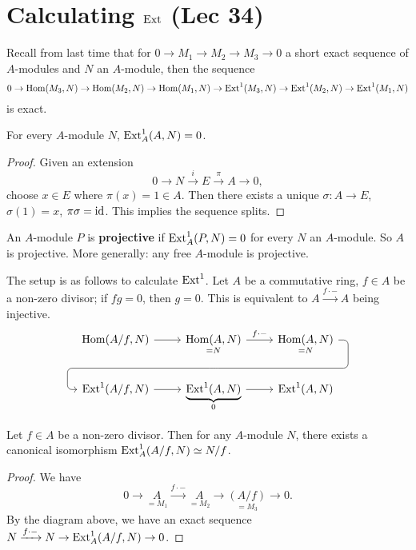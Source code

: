 \section{Calculating $\operatorname{Ext}$ (Lec 34)} 
Recall from last time that for $0 \to M_1 \to M_2 \to M_3 \to 0$ a short exact sequence of $A$-modules and $N$ an $A$-module, then the sequence \[
    0 \to \operatorname{Hom}(M_3,N) \to \operatorname{Hom}(M_2,N) \to \operatorname{Hom}(M_1,N) \to \operatorname{Ext}^1(M_3,N) \to \operatorname{Ext}^1(M_2,N) \to \operatorname{Ext}^1(M_1,N)
\] is exact.
\begin{lemma}
    For every $A$-module $N$, $\operatorname{Ext}^1_A(A,N)=0$.
\end{lemma}
\begin{proof}
    Given an extension \[
    0 \to  N \xrightarrow iE \xrightarrow{\pi} A \to 0,
\] choose $x \in E$ where $\pi(x)=1 \in  A$. Then there exists a unique $\sigma \colon A \to E$, $\sigma(1)=x$, $\pi \sigma=\operatorname{id}$. This implies the sequence splits.
\end{proof}
\begin{remark}
    An $A$-module $P$ is \textbf{projective} if $\operatorname{Ext}_A^1(P,N)=0$ for every $N$ an $A$-module. So $A$ is projective. More generally: any free $A$-module is projective. 
\end{remark}

The setup is as follows to calculate $\operatorname{Ext}^1$. Let $A$ be a commutative ring, $f \in A$ be a non-zero divisor; if $fg=0$, then $g=0$. This is equivalent to $A \xrightarrow{f \cdot -} A$ being injective.
\[
\begin{tikzcd}
    \Hom(A /f,N) \rar & \underset{=N}{\Hom(A,N)}  \arrow[r,"f\cdot -"]
             \ar[draw=none]{d}[name=X, anchor=center]{}
                     & \underset{=N}{\Hom(A,N)}  \ar[rounded corners,
            to path={ -- ([xshift=2ex]\tikztostart.east)
                      |- (X.center) \tikztonodes
                      -| ([xshift=-2ex]\tikztotarget.west)
                      -- (\tikztotarget)}]{dll}[at end]{} \\      
\Ext^1(A /f,N) \rar & \underset{0}{\underbrace{\Ext^1(A,N)}}  \rar & \Ext^1(A,N)
\end{tikzcd}
\] 
\begin{prop}
    Let $f \in A$ be a non-zero divisor. Then for any $A$-module $N$, there exists a canonical isomorphism $\operatorname{Ext}^1_A( A / f ,N) \simeq  N /f$.
\end{prop}
\begin{proof}
    We have 
    \[
    0 \to \underset{=M_1}{A}  \xrightarrow{f \cdot -} \underset{=M_2}{A} \to  \underset{=M_3}{(A/f)}  \to 0.
    \] 
    By the diagram above, we have an exact sequence $N \xrightarrow{f \cdot -} N \to \operatorname{Ext}_A^1(A /f,N)\to 0$.
\end{proof}

